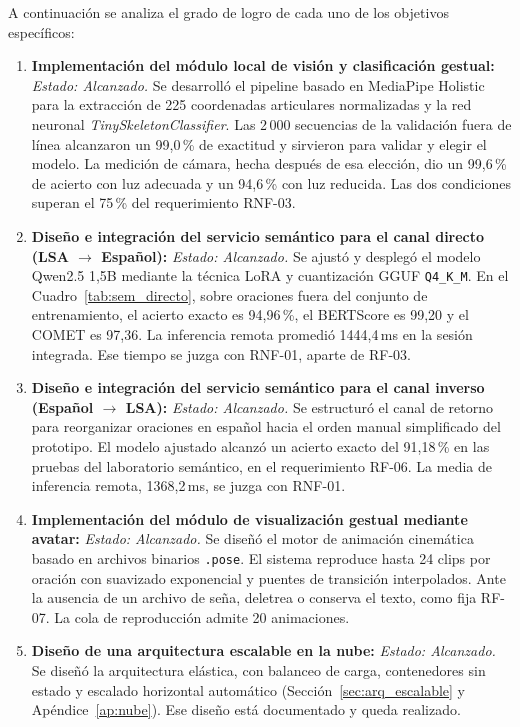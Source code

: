 A continuación se analiza el grado de logro de cada uno de los objetivos específicos:

\begin{enumerate}
    \item \textbf{Implementación del módulo local de visión y clasificación gestual:}
    \textit{Estado: Alcanzado.}
    Se desarrolló el pipeline basado en MediaPipe Holistic para la extracción de 225 coordenadas articulares normalizadas y la red neuronal \textit{TinySkeletonClassifier}. Las 2\,000 secuencias de la validación fuera de línea alcanzaron un 99{,}0\,\% de exactitud y sirvieron para validar y elegir el modelo. La medición de cámara, hecha después de esa elección, dio un 99{,}6\,\% de acierto con luz adecuada y un 94{,}6\,\% con luz reducida. Las dos condiciones superan el 75\,\% del requerimiento RNF-03.

    \item \textbf{Diseño e integración del servicio semántico para el canal directo (LSA $\rightarrow$ Español):}
    \textit{Estado: Alcanzado.}
    Se ajustó y desplegó el modelo Qwen2.5 1,5B mediante la técnica LoRA y cuantización GGUF \texttt{Q4\_K\_M}. En el Cuadro~\ref{tab:sem_directo}, sobre oraciones fuera del conjunto de entrenamiento, el acierto exacto es 94,96\,\%, el BERTScore es 99,20 y el COMET es 97,36. La inferencia remota promedió 1444,4\,ms en la sesión integrada. Ese tiempo se juzga con RNF-01, aparte de RF-03.

    \item \textbf{Diseño e integración del servicio semántico para el canal inverso (Español $\rightarrow$ LSA):}
    \textit{Estado: Alcanzado.}
    Se estructuró el canal de retorno para reorganizar oraciones en español hacia el orden manual simplificado del prototipo. El modelo ajustado alcanzó un acierto exacto del 91,18\,\% en las pruebas del laboratorio semántico, en el requerimiento RF-06. La media de inferencia remota, 1368,2\,ms, se juzga con RNF-01.

    \item \textbf{Implementación del módulo de visualización gestual mediante avatar:}
    \textit{Estado: Alcanzado.}
    Se diseñó el motor de animación cinemática basado en archivos binarios \texttt{.pose}. El sistema reproduce hasta 24 clips por oración con suavizado exponencial y puentes de transición interpolados. Ante la ausencia de un archivo de seña, deletrea o conserva el texto, como fija RF-07. La cola de reproducción admite 20 animaciones.

    \item \textbf{Diseño de una arquitectura escalable en la nube:}
    \textit{Estado: Alcanzado.}
    Se diseñó la arquitectura elástica, con balanceo de carga, contenedores sin estado y escalado horizontal automático (Sección~\ref{sec:arq_escalable} y Apéndice~\ref{ap:nube}). Ese diseño está documentado y queda realizado.


\end{enumerate}
